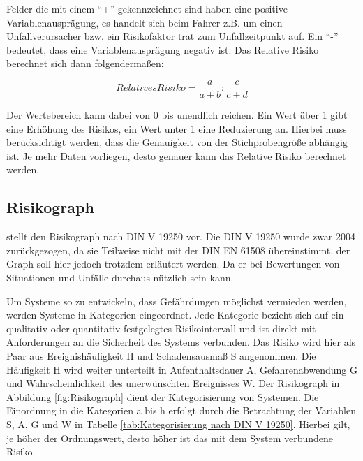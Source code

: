 Felder die mit einem \enquote{+} gekennzeichnet sind haben eine positive Variablenausprägung, es handelt sich beim Fahrer z.B. um einen Unfallverursacher bzw. ein Risikofaktor trat zum Unfallzeitpunkt auf. Ein \enquote{-} bedeutet, dass eine Variablenausprägung negativ ist. Das Relative Risiko berechnet sich dann folgendermaßen:

\begin{equation}
	Relatives Risiko = \dfrac{a}{a+b}:\dfrac{c}{c+d}
\end{equation}

Der Wertebereich kann dabei von 0 bis unendlich reichen. Ein Wert über 1 gibt eine Erhöhung des Risikos, ein Wert unter 1 eine Reduzierung an. Hierbei muss berücksichtigt werden, dass die Genauigkeit von der Stichprobengröße abhängig ist. Je mehr Daten vorliegen, desto genauer kann das Relative Risiko berechnet werden.

\subsection{Risikograph}
\Textcite[S. 50f]{Hillenbrand.2012} stellt den Risikograph nach DIN V 19250 vor. Die DIN V 19250 wurde zwar 2004 zurückgezogen, da sie Teilweise nicht mit der DIN EN 61508 übereinstimmt, der Graph soll hier jedoch trotzdem erläutert werden. Da er bei Bewertungen von Situationen und Unfälle durchaus nützlich sein kann.

Um Systeme so zu entwickeln, dass Gefährdungen möglichst vermieden werden, werden Systeme in Kategorien eingeordnet. Jede Kategorie bezieht sich auf ein qualitativ oder quantitativ festgelegtes Risikointervall und ist direkt mit Anforderungen an die Sicherheit des Systems verbunden. Das Risiko wird hier als Paar aus Ereignishäufigkeit H und Schadensausmaß S angenommen. Die Häufigkeit H wird weiter unterteilt in Aufenthaltsdauer A, Gefahrenabwendung G und Wahrscheinlichkeit des unerwünschten Ereignisses W. Der Risikograph in Abbildung \ref{fig:Risikograph} dient der Kategorisierung von Systemen. Die Einordnung in die Kategorien a bis h erfolgt durch die Betrachtung der Variablen S, A, G und W in Tabelle \ref{tab:Kategorisierung nach DIN V 19250}. Hierbei gilt, je höher der Ordnungswert, desto höher ist das mit dem System verbundene Risiko.

